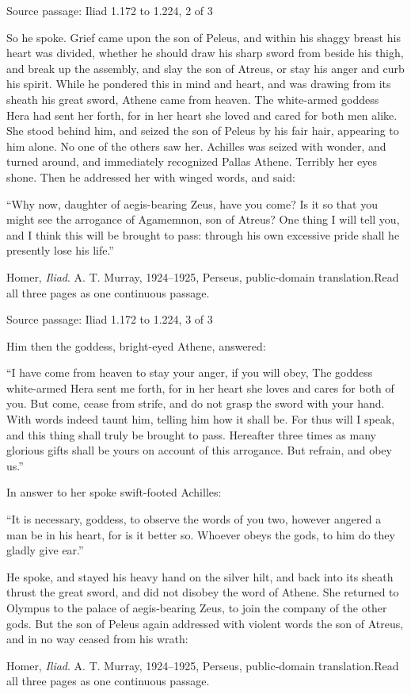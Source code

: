 \documentclass[aspectratio=169,10pt]{beamer}
\newcommand{\source}[1]{\vfill{\scriptsize\color{slate}#1\par}}
\begin{document}
\begin{frame}{Source passage: Iliad 1.172 to 1.224, 2 of 3}
\small\raggedright\setlength{\parskip}{3pt}
So he spoke. Grief came upon the son of Peleus, and within his shaggy breast his heart was divided, whether he should draw his sharp sword from beside his thigh, and break up the assembly, and slay the son of Atreus, or stay his anger and curb his spirit. While he pondered this in mind and heart, and was drawing from its sheath his great sword, Athene came from heaven. The white-armed goddess Hera had sent her forth, for in her heart she loved and cared for both men alike. She stood behind him, and seized the son of Peleus by his fair hair, appearing to him alone. No one of the others saw her. Achilles was seized with wonder, and turned around, and immediately recognized Pallas Athene. Terribly her eyes shone. Then he addressed her with winged words, and said:

“Why now, daughter of aegis-bearing Zeus, have you come? Is it so that you might see the arrogance of Agamemnon, son of Atreus? One thing I will tell you, and I think this will be brought to pass: through his own excessive pride shall he presently lose his life.”
\source{Homer, \emph{Iliad}. A. T. Murray, 1924--1925, Perseus, public-domain translation.\newline Read all three pages as one continuous passage.}
\end{frame}

\begin{frame}{Source passage: Iliad 1.172 to 1.224, 3 of 3}
\small\raggedright\setlength{\parskip}{3pt}
Him then the goddess, bright-eyed Athene, answered:

“I have come from heaven to stay your anger, if you will obey, The goddess white-armed Hera sent me forth, for in her heart she loves and cares for both of you. But come, cease from strife, and do not grasp the sword with your hand. With words indeed taunt him, telling him how it shall be. For thus will I speak, and this thing shall truly be brought to pass. Hereafter three times as many glorious gifts shall be yours on account of this arrogance. But refrain, and obey us.”

In answer to her spoke swift-footed Achilles:

“It is necessary, goddess, to observe the words of you two, however angered a man be in his heart, for is it better so. Whoever obeys the gods, to him do they gladly give ear.”

He spoke, and stayed his heavy hand on the silver hilt, and back into its sheath thrust the great sword, and did not disobey the word of Athene. She returned to Olympus to the palace of aegis-bearing Zeus, to join the company of the other gods. But the son of Peleus again addressed with violent words the son of Atreus, and in no way ceased from his wrath:
\source{Homer, \emph{Iliad}. A. T. Murray, 1924--1925, Perseus, public-domain translation.\newline Read all three pages as one continuous passage.}
\end{frame}
\end{document}
